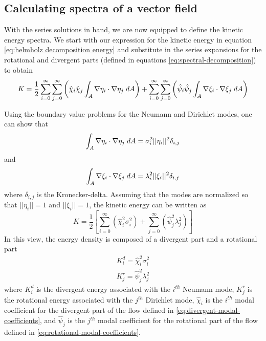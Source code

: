 \documentclass[draft]{agujournal2019}
\begin{document}
\subsection{Calculating spectra of a vector field} \label{calculating-spectra}
With the series solutions in hand, we are now equipped to define the kinetic energy spectra. We start with our expression for the kinetic energy in equation \eqref{eq:helmholz decomposition energy} and substitute in the series expansions for the rotational and divergent parts (defined in equations \eqref{eq:spectral-decomposition}) to obtain
\begin{equation}
    K = \frac{1}{2}\sum_{i=0}^\infty \sum_{j=0}^\infty\left( \hat{\chi}_i \hat\chi_j\int_A \nabla \eta_i \cdot \nabla \eta_j \hspace{1mm} dA \right) + \sum_{i=0}^\infty \sum_{j=0}^\infty\left(\hat{\psi}_i \hat\psi_j\int_A \nabla \xi_i \cdot \nabla \xi_j \hspace{1mm} dA \right)
\end{equation}

Using the boundary value problems for the Neumann and Dirichlet modes, one can show that
\begin{equation}
    \int_A \nabla \eta_i \cdot \nabla \eta_j \hspace{1mm} dA = \sigma_i^{2} || \eta_i ||^2 \delta_{i,j}
\end{equation}
and
\begin{equation}
    \int_A \nabla \xi_i \cdot \nabla \xi_j \hspace{1mm} dA = \lambda_i^{2} || \xi_i ||^2 \delta_{i,j}
\end{equation}
where $\delta_{i,j}$ is the Kronecker-delta. Assuming that the modes are normalized so that $||\eta_i|| = 1$ and $||\xi_i|| = 1$, the kinetic energy can be written as
\begin{equation}
    K = \frac{1}{2}\left[ \sum_{i=0}^\infty \left( \hat{\chi}_i^2\sigma_i^{2} \right) + \sum_{j=0}^{\infty}\left(\hat{\psi}_j^2\lambda_j^2 \right) \right] \label{eq:spectral energy}
\end{equation}
In this view, the energy density is composed of a divergent part and a rotational part
\begin{subequations}
    \begin{align}
        K^d_i = \hat{\chi}_i^2\sigma_i^2 \\
        K^r_j = \hat{\psi}_j^2\lambda_j^2
    \end{align}
\end{subequations}
where $K^d_i$ is the divergent energy associated with the $i^{th}$ Neumann mode, $K^r_j$ is the rotational energy associated with the $j^{th}$ Dirichlet mode, $\hat{\chi}_i$ is the $i^{th}$ modal coefficient for the divergent part of the flow defined in \eqref{eq:divergent-modal-coefficients}, and $\hat{\psi}_j$ is the $j^{th}$ modal coefficient for the rotational part of the flow defined in \eqref{eq:rotational-modal-coefficients}.
\end{document}
